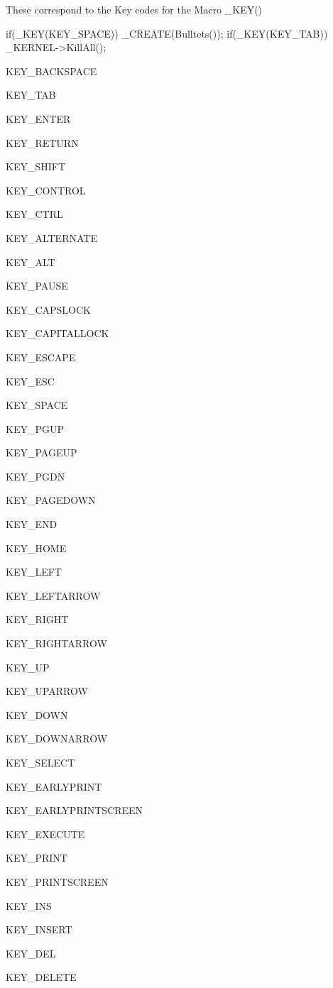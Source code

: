 These correspond to the Key codes for the Macro \_\-KEY() 
\begin{DoxyCode}
 if(_KEY(KEY_SPACE)) _CREATE(Bulltets());
 if(_KEY(KEY_TAB)) _KERNEL->KillAll();
\end{DoxyCode}


KEY\_\-BACKSPACE \par
 KEY\_\-TAB \par
 KEY\_\-ENTER \par
 KEY\_\-RETURN \par
 KEY\_\-SHIFT \par
 KEY\_\-CONTROL \par
 KEY\_\-CTRL \par
 KEY\_\-ALTERNATE \par
 KEY\_\-ALT \par
 KEY\_\-PAUSE \par
 KEY\_\-CAPSLOCK \par
 KEY\_\-CAPITALLOCK \par
 KEY\_\-ESCAPE \par
 KEY\_\-ESC \par
 KEY\_\-SPACE \par
 KEY\_\-PGUP \par
 KEY\_\-PAGEUP \par
 KEY\_\-PGDN \par
 KEY\_\-PAGEDOWN \par
 KEY\_\-END \par
 KEY\_\-HOME \par
 KEY\_\-LEFT \par
 KEY\_\-LEFTARROW \par
 KEY\_\-RIGHT \par
 KEY\_\-RIGHTARROW \par
 KEY\_\-UP \par
 KEY\_\-UPARROW \par
 KEY\_\-DOWN \par
 KEY\_\-DOWNARROW \par
 KEY\_\-SELECT \par
 KEY\_\-EARLYPRINT \par
 KEY\_\-EARLYPRINTSCREEN \par
 KEY\_\-EXECUTE \par
 KEY\_\-PRINT \par
 KEY\_\-PRINTSCREEN \par
 KEY\_\-INS \par
 KEY\_\-INSERT \par
 KEY\_\-DEL \par
 KEY\_\-DELETE \par
